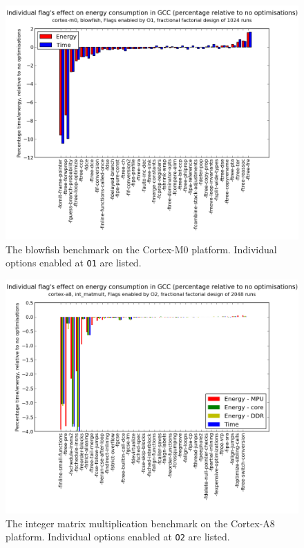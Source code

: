 \documentclass[twocolumn]{article}
\begin{document}
\begin{figure}[tb]
	\includegraphics[width=\linewidth]{cortex-m0/O1_main_effects_blowfish.png}
	\caption{The blowfish benchmark on the Cortex-M0 platform. Individual options enabled at \texttt{O1} are listed.}
	\label{Fig:BlowfishMainEffects}
\end{figure}

\begin{figure}[tb]
	\includegraphics[width=\linewidth]{cortex-a8/O2_main_effects_int_matmult.png}
	\caption{The integer matrix multiplication benchmark on the Cortex-A8 platform. Individual options enabled at \texttt{O2} are listed.}
	\label{Fig:IntMatmultO2MainEffects}
\end{figure}
\end{document}
